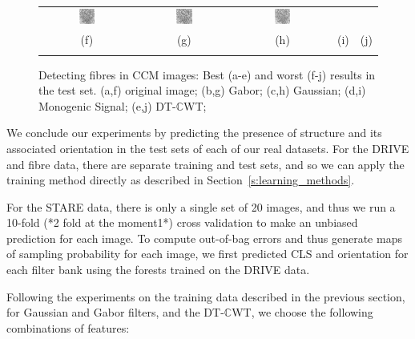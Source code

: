 \documentclass{IEEEtran}
\newcommand{\sref}[1]{Section~\ref{#1}}
\def\dtcwt{DT-$\mathbb{C}$WT}
\begin{document}
\begin{figure}[t]
\begin{tabular}{@{}c c c c c@{}}
\includegraphics[width=0.18\textwidth]{figs/fibre/51_fibre_segmentation_gh2da_inv} &
\includegraphics[width=0.18\textwidth]{figs/fibre/51_fibre_segmentation_mono_inv} &
\includegraphics[width=0.18\textwidth]{figs/fibre/51_fibre_segmentation_dt_inv} \\
(f) & (g) & (h) & (i)  & (j) \\
\noalign{\smallskip}
\end{tabular}
%
\caption{Detecting fibres in CCM images: Best (a-e) and worst (f-j) results in the test set. %
(a,f) original image; %
(b,g) Gabor; %
(c,h) Gaussian; %
(d,i) Monogenic Signal; %
(e,j) \dtcwt; %
}
\label{f:fibre_segmentations}
\end{figure}
%
We conclude our experiments by predicting the presence of structure and its associated orientation in the test sets of each of our real datasets. For the DRIVE and fibre data, there are separate training and test sets, and so we can apply the training method directly as described in \sref{s:learning_methods}.

For the STARE data, there is only a single set of 20 images, and thus we run a 10-fold (*2 fold at the moment1*) cross validation to make an unbiased prediction for each image. To compute out-of-bag errors and thus generate maps of sampling probability for each image, we first predicted CLS and orientation for each filter bank using the forests trained on the DRIVE data.

Following the experiments on the training data described in the previous section, for Gaussian and Gabor filters, and the \dtcwt, we choose the following combinations of features:
\end{document}
